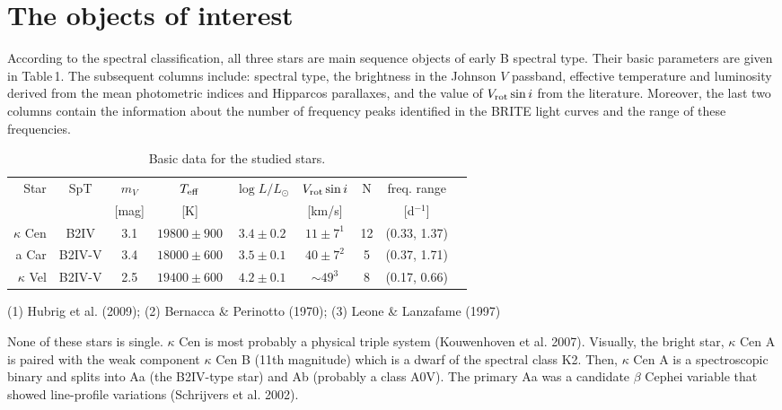 \documentclass{ptapap}
\begin{document}
\section{The objects of interest}

According to the spectral classification, all three stars are main sequence objects of early B spectral type.
Their basic parameters are given in Table\,1. The subsequent columns include: spectral type, the brightness in the Johnson $V$ passband,
effective temperature and luminosity derived from the mean photometric indices and Hipparcos parallaxes, and the value of  $V_{\rm rot}\sin i$ from the literature.
Moreover, the last two columns contain the information about the number of frequency peaks identified in the BRITE light curves
and the range of these frequencies.

\begin{table*}
\begin{center}
\caption{Basic data for the studied stars.}
\begin{tabular}{|r|c|c|c|c|c|c|c|c|}
\hline
  Star    &   SpT  & $m_V$ & $T_{\rm eff}$ & $\log L/L_\odot$ & $V_{\rm rot}\sin i$ &  N & freq. range   \\
          &        & [mag] &      [K]      &                  &    [km/s] &    & [d$^{-1}$] \\
\hline
\hline
$\kappa$ Cen &  B2IV  & 3.1  &   $19800\pm900$   &    $3.4\pm0.2$   &     $11\pm7^1$     & 12 & (0.33, 1.37) \\
\hline
       a Car & B2IV-V & 3.4  &   $18000\pm600$   &    $3.5\pm0.1$   &     $40\pm7^2$     &  5 & (0.37, 1.71) \\
\hline
$\kappa$ Vel & B2IV-V & 2.5  &   $19400\pm600$   &    $4.2\pm0.1$   &      $\sim 49^3$   &  8 &  (0.17, 0.66) \\
\hline
\end{tabular}
{\small (1) Hubrig et al. (2009); (2) Bernacca \& Perinotto (1970); (3) Leone \& Lanzafame (1997)}
\end{center}
\end{table*}


None of these stars is single. $\kappa$ Cen is most probably a physical triple system (Kouwenhoven et al. 2007).
Visually, the bright star, $\kappa$ Cen A is paired with the weak component $\kappa$ Cen B (11th magnitude)
which is a dwarf of the spectral class K2.
Then, $\kappa$ Cen A is a spectroscopic binary and splits into Aa (the B2IV-type star) and Ab (probably a class A0V).
The primary Aa was a candidate $\beta$ Cephei variable that showed line-profile variations (Schrijvers et al. 2002).
\end{document}
